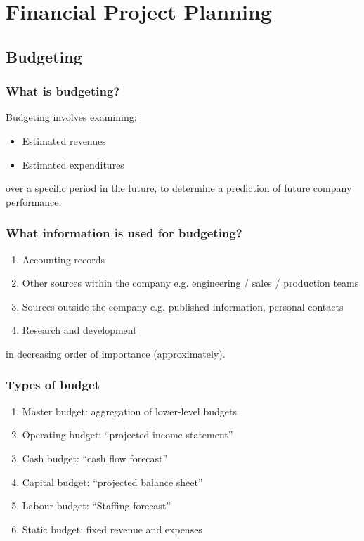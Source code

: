 \chapter{Financial Project Planning}
\section{Budgeting}
\subsection{What is budgeting?}
Budgeting involves examining:
\begin{itemize}
    \item Estimated revenues
    \item Estimated expenditures
\end{itemize}
over a specific period in the future, to determine a prediction of future company performance.
\subsection{What information is used for budgeting?}
\begin{enumerate}
    \item Accounting records
    \item Other sources within the company e.g. engineering / sales / production teams
    \item Sources outside the company e.g. published information, personal contacts
    \item Research and development
\end{enumerate}
in decreasing order of importance (approximately).
\subsection{Types of budget}
\begin{enumerate}
    \item Master budget: aggregation of lower-level budgets
    \item Operating budget: ``projected income statement''
    \item Cash budget: ``cash flow forecast''
    \item Capital budget: ``projected balance sheet''
    \item Labour budget: ``Staffing forecast''
    \item Static budget: fixed revenue and expenses
\end{enumerate}
